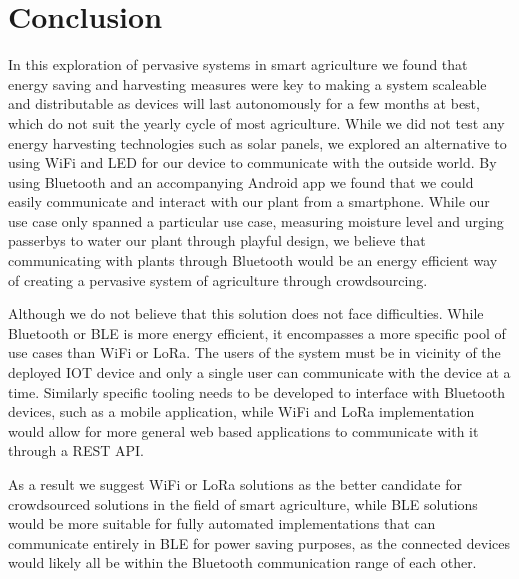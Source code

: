\documentclass[10pt]{sensys-proc}
\begin{document}
\section{Conclusion}
In this exploration of pervasive systems in smart agriculture we found that energy saving and harvesting measures were key to making a system scaleable and distributable as devices will last autonomously for a few months at best, which do not suit the yearly cycle of most agriculture. While we did not test any energy harvesting technologies such as solar panels, we explored an alternative to using WiFi and LED for our device to communicate with the outside world. By using Bluetooth and an accompanying Android app we found that we could easily communicate and interact with our plant from a smartphone. While our use case only spanned a particular use case, measuring moisture level and urging passerbys to water our plant through playful design, we believe that communicating with plants through Bluetooth would be an energy efficient way of creating a pervasive system of agriculture through crowdsourcing. 

Although we do not believe that this solution does not face difficulties. While Bluetooth or BLE is more energy efficient, it encompasses a more specific pool of use cases than WiFi or LoRa. The users of the system must be in vicinity of the deployed IOT device and only a single user can communicate with the device at a time. Similarly specific tooling needs to be developed to interface with Bluetooth devices, such as a mobile application, while WiFi and LoRa implementation would allow for more general web based applications to communicate with it through a REST API. 

As a result we suggest WiFi or LoRa solutions as the better candidate for crowdsourced solutions in the field of smart agriculture, while BLE solutions would be more suitable for fully automated implementations that can communicate entirely in BLE for power saving purposes, as the connected devices would likely all be within the Bluetooth communication range of each other.

\balance

\end{document}
